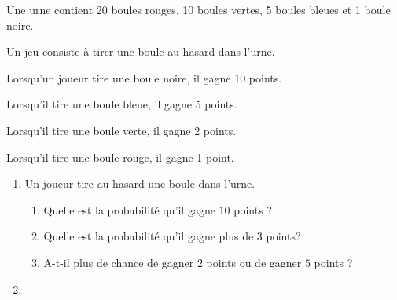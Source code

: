 \documentclass[exercice,a4]{thedocument}%
\begin{document}
%

\medskip

Une urne contient 20 boules rouges, 10 boules vertes, 5 boules bleues et 1 boule noire.

Un jeu consiste à tirer une boule au hasard dans l'urne.

Lorsqu'un joueur tire une boule noire, il gagne 10 points.

Lorsqu'il tire une boule bleue, il gagne 5 points.

Lorsqu'il tire une boule verte, il gagne 2 points.

Lorsqu'il tire une boule rouge, il gagne 1 point.

\medskip

\begin{enumerate}
\item Un joueur tire au hasard une boule dans l'urne.
	\begin{enumerate}
		\item Quelle est la probabilité qu'il gagne $10$ points ?
		\item Quelle est la probabilité qu'il gagne plus de $3$ points?
		\item A-t-il plus de chance de gagner $2$ points ou de gagner $5$ points ?
	\end{enumerate}

\item~


\end{enumerate}
\end{document}
